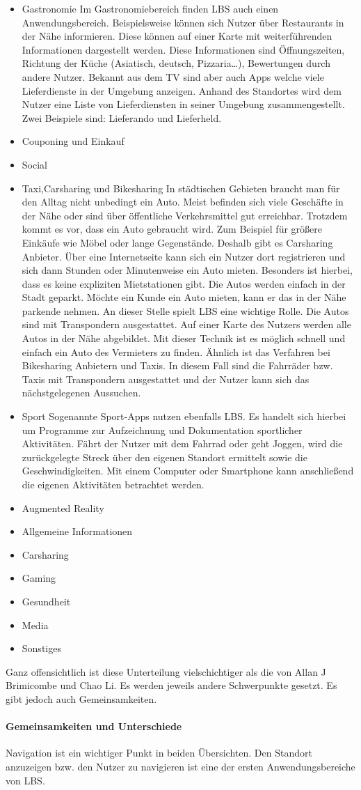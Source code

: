 \begin{itemize}
	\item Gastronomie
	Im Gastronomiebereich finden LBS auch einen Anwendungsbereich. Beispielsweise können sich Nutzer über Restaurants in der Nähe informieren. Diese können auf einer Karte mit weiterführenden Informationen dargestellt werden. Diese Informationen sind Öffnungszeiten, Richtung der Küche (Asiatisch, deutsch, Pizzaria…), Bewertungen durch andere Nutzer.
Bekannt aus dem TV sind aber auch Apps welche viele Lieferdienste in der Umgebung anzeigen. Anhand des Standortes wird dem Nutzer eine Liste von Lieferdiensten in seiner Umgebung zusammengestellt. Zwei Beispiele sind: Lieferando und Lieferheld.

	\item Couponing und Einkauf
	\item Social
	\item Taxi,Carsharing und Bikesharing
	In städtischen Gebieten braucht man für den Alltag nicht unbedingt ein Auto. Meist befinden sich viele Geschäfte in der Nähe oder sind über öffentliche Verkehrsmittel gut erreichbar. Trotzdem kommt es vor, dass ein Auto gebraucht wird. Zum Beispiel für größere Einkäufe wie Möbel oder lange Gegenstände. Deshalb gibt es Carsharing Anbieter. Über eine Internetseite kann sich ein Nutzer dort registrieren und sich dann Stunden oder Minutenweise ein Auto mieten. Besonders ist hierbei, dass es keine expliziten Mietstationen gibt. Die Autos werden einfach in der Stadt geparkt. Möchte ein Kunde ein Auto mieten, kann er das in der Nähe parkende nehmen. An dieser Stelle spielt LBS eine wichtige Rolle. Die Autos sind mit Transpondern ausgestattet. Auf einer Karte des Nutzers werden alle Autos in der Nähe abgebildet. Mit dieser Technik ist es möglich schnell und einfach ein Auto des Vermieters zu finden. Ähnlich ist das Verfahren bei Bikesharing Anbietern und Taxis. In diesem Fall sind die Fahrräder bzw. Taxis mit Transpondern ausgestattet und der Nutzer kann sich das nächstgelegenen Aussuchen.
	\item Sport
	Sogenannte Sport-Apps nutzen ebenfalls LBS. Es handelt sich hierbei um Programme zur Aufzeichnung und Dokumentation sportlicher Aktivitäten. Fährt der Nutzer mit dem Fahrrad oder geht Joggen, wird die zurückgelegte Streck über den eigenen Standort ermittelt  sowie die Geschwindigkeiten. Mit einem Computer oder Smartphone kann anschließend die eigenen Aktivitäten betrachtet werden. 
	\item Augmented Reality
	\item Allgemeine Informationen
	\item Carsharing
	\item Gaming
	\item Gesundheit
	\item Media
	\item Sonstiges
\end{itemize}
Ganz offensichtlich ist diese Unterteilung vielschichtiger als die von Allan J Brimicombe und Chao Li. Es werden jeweils andere Schwerpunkte gesetzt. Es gibt jedoch auch Gemeinsamkeiten.

\paragraph{Gemeinsamkeiten und Unterschiede}
Navigation ist ein wichtiger Punkt in beiden Übersichten. Den Standort anzuzeigen bzw. den Nutzer zu navigieren ist eine der ersten Anwendungsbereiche von LBS.